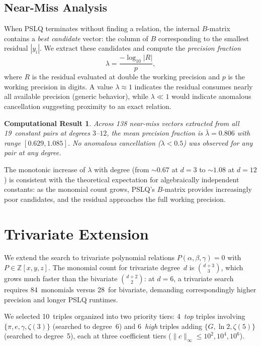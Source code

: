 \documentclass[11pt]{amsart}
\newtheorem{result}[theorem]{Computational Result}
\theoremstyle{remark}
\newcommand{\Z}{\mathbb{Z}}
\newcommand{\norm}[1]{\lVert #1 \rVert}
\begin{document}
\subsection{Near-Miss Analysis}\label{ssec:nearmiss}

When PSLQ terminates without finding a relation, the internal $B$-matrix
contains a \emph{best candidate} vector: the column of $B$ corresponding
to the smallest residual $|y_i|$. We extract these candidates and compute
the \emph{precision fraction}
\[
  \lambda = \frac{-\log_{10}|R|}{p},
\]
where $R$ is the residual evaluated at double the working precision and $p$ is the
working precision in digits. A value $\lambda \approx 1$ indicates the
residual consumes nearly all available precision (generic behavior), while
$\lambda \ll 1$ would indicate anomalous cancellation suggesting proximity
to an exact relation.

\begin{result}\label{res:nearmiss}
Across 138 near-miss vectors extracted from all 19~constant pairs at degrees
$3$--$12$, the mean precision fraction is $\bar{\lambda} = 0.806$ with range
$[0.629, 1.085]$. No anomalous cancellation ($\lambda < 0.5$) was observed
for any pair at any degree.
\end{result}

The monotonic increase of $\lambda$ with degree (from ${\sim}0.67$ at $d=3$ to
${\sim}1.08$ at $d=12$) is consistent with the theoretical expectation for
algebraically independent constants: as the monomial count grows, PSLQ's
$B$-matrix provides increasingly poor candidates, and the residual approaches
the full working precision.

\section{Trivariate Extension}\label{sec:trivariate}

We extend the search to trivariate polynomial relations
$P(\alpha,\beta,\gamma) = 0$ with $P \in \Z[x,y,z]$.
The monomial count for trivariate degree~$d$ is $\binom{d+3}{3}$,
which grows much faster than the bivariate $\binom{d+2}{2}$: at $d=6$,
a trivariate search requires 84~monomials versus 28~for bivariate, demanding
correspondingly higher precision and longer PSLQ runtimes.

We selected 10~triples organized into two priority tiers: 4~\emph{top}
triples involving $\{\pi, e, \gamma, \zeta(3)\}$ (searched to degree~6) and
6~\emph{high} triples adding $\{G, \ln 2, \zeta(5)\}$ (searched to degree~5),
each at three coefficient tiers ($\norm{c}_\infty \le 10^2, 10^4, 10^6$).
\end{document}
